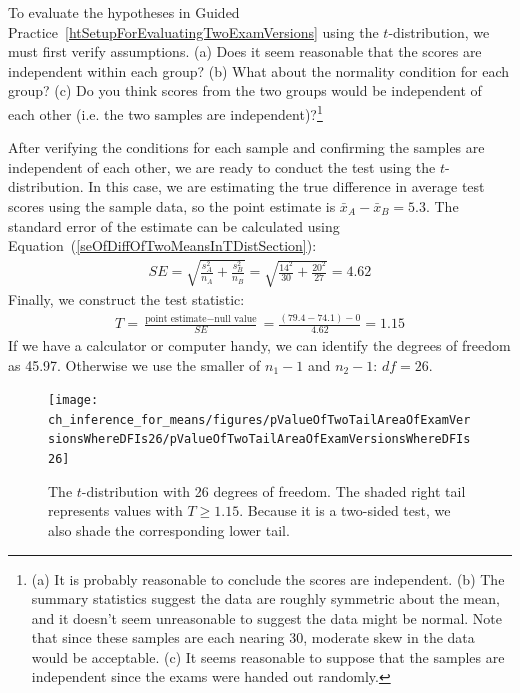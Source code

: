 \begin{exercise} \label{conditionsForTDistForEvaluatingTwoExamVersions}
To evaluate the hypotheses in Guided Practice~\ref{htSetupForEvaluatingTwoExamVersions} using the $t$-distribution, we must first verify assumptions. (a) Does it seem reasonable that the scores are independent within each group? (b) What about the normality condition for each group? (c) Do you think scores from the two groups would be independent of each other (i.e. the two samples are independent)?\footnote{(a) It is probably reasonable to conclude the scores are independent. (b) The summary statistics suggest the data are roughly symmetric about the mean, and it doesn't seem unreasonable to suggest the data might be normal. Note that since these samples are each nearing 30, moderate skew in the data would be acceptable. (c) It seems reasonable to suppose that the samples are independent since the exams were handed out randomly.}
\end{exercise}

After verifying the conditions for each sample and confirming the samples are independent of each other, we are ready to conduct the test using the $t$-distribution. In this case, we are estimating the true difference in average test scores using the sample data, so the point estimate is $\bar{x}_A - \bar{x}_B = 5.3$. The standard error of the estimate can be calculated using Equation~(\ref{seOfDiffOfTwoMeansInTDistSection}):
\begin{eqnarray*}
SE = \sqrt{\frac{s_A^2}{n_A} + \frac{s_B^2}{n_B}} = \sqrt{\frac{14^2}{30} + \frac{20^2}{27}} = 4.62
\end{eqnarray*}
Finally, we construct the test statistic:
\begin{eqnarray*}
T = \frac{\text{point estimate} - \text{null value}}{SE} = \frac{(79.4-74.1) - 0}{4.62} = 1.15
\end{eqnarray*}
If we have a calculator or computer handy, we can identify the degrees of freedom as 45.97. Otherwise we use the smaller of $n_1-1$ and $n_2-1$: $df=26$.

\begin{figure}
\centering
\texttt{[image: ch\_inference\_for\_means/figures/pValueOfTwoTailAreaOfExamVersionsWhereDFIs26/pValueOfTwoTailAreaOfExamVersionsWhereDFIs26]}
\caption{The $t$-distribution with 26 degrees of freedom. The shaded right tail represents values with $T \geq 1.15$. Because it is a two-sided test, we also shade the corresponding lower tail.}
\label{pValueOfTwoTailAreaOfExamVersionsWhereDFIs26}
\end{figure}

